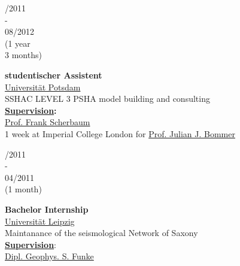 \documentclass{article}
\begin{document}
\begin{minipage}[t]{0.69\textwidth}
\begin{minipage}{0.49\textwidth}
		\vspace{0.5cm}
		
		\begin{minipage}[t]{0.25\textwidth}
		/2011\\ -\\ 08/2012 \\(1 year \\3 months)
		\end{minipage}
		\hfill
		\begin{minipage}[t]{0.75\textwidth}
		\textbf{studentischer Assistent}\\
		\href{https://www.uni-potsdam.de/}{\color{pblue}Universität Potsdam}\\
	    SSHAC LEVEL 3 PSHA model building and consulting\\
	      \textbf{\underline{Supervision}:}\\
	     \href{http://www.geo.uni-potsdam.de/mitarbeiterdetails/show/96/Frank_Scherbaum.html/}{\color{pblue}Prof. Frank Scherbaum}\\
	    1 week at Imperial College London for \href{https://www.imperial.ac.uk/people/j.bommer}{\color{pblue}Prof. Julian J. Bommer}
		\end{minipage}
		
		\vspace{0.5cm}
		
		\begin{minipage}[t]{0.25\textwidth}
		/2011\\ - \\ 04/2011\\(1 month)
		\end{minipage}		
		\hfill
		\begin{minipage}[t]{0.75\textwidth}
		\textbf{Bachelor Internship}\\
		\href{http://geologie.physgeo.uni-leipzig.de}{\color{pblue}Universität Leipzig}\\
	    Maintanance of the seismological Network of Saxony\\ 
	     \textbf{\underline{Supervision}}: \\
	     \href{mailto:sfunke@rz.uni-leipzig.de}{Dipl. Geophys. S. Funke}
		\end{minipage}
		
		\vspace{0.5cm}
		

\end{minipage}
\end{minipage}
\end{document}
